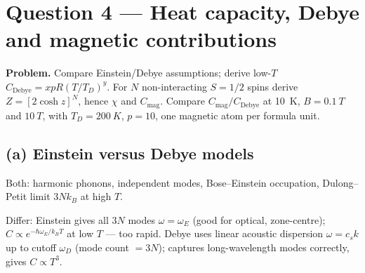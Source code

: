 \documentclass[11pt]{article}
\begin{document}
\begin{center}
\end{center}

\section*{Question 4 --- Heat capacity, Debye and magnetic contributions}

\textbf{Problem.} Compare Einstein/Debye assumptions; derive low-$T$ $C_{\text{Debye}}=xpR(T/T_D)^y$. For $N$ non-interacting $S=1/2$ spins derive $Z=[2\cosh z]^N$, hence $\chi$ and $C_{\text{mag}}$. Compare $C_{\text{mag}}/C_{\text{Debye}}$ at \SI{10}{K}, $B=\SI{0.1}{T}$ and $\SI{10}{T}$, with $T_D=\SI{200}{K}$, $p=10$, one magnetic atom per formula unit.

\subsection*{(a) Einstein versus Debye models}

Both: harmonic phonons, independent modes, Bose--Einstein occupation, Dulong--Petit limit $3Nk_B$ at high $T$.

Differ: Einstein gives all $3N$ modes $\omega=\omega_E$ (good for optical, zone-centre); $C\propto e^{-\hbar\omega_E/k_BT}$ at low $T$ --- too rapid. Debye uses linear acoustic dispersion $\omega=c_sk$ up to cutoff $\omega_D$ (mode count $=3N$); captures long-wavelength modes correctly, gives $C\propto T^3$.
\end{document}
